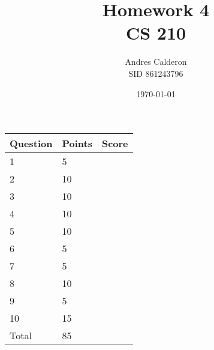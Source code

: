 \documentclass{article}
\title{Homework 4\\CS 210}
\author{Andres Calderon \\ SID 861243796}
\date{\today}
\begin{document}
\maketitle

\begin{center}
\begin{tabular}{|l|l|p{.4in}|}
\hline Question & Points & Score \\
\hline  1 & 5 & \\
\hline  2 & 10 & \\
\hline  3 & 10 & \\
\hline  4 & 10 & \\
\hline  5 & 10 & \\
\hline  6 &  5 & \\
\hline  7 &  5 & \\
\hline  8 &  10 & \\
\hline  9 &  5 & \\
\hline 10 & 15 & \\
\hline Total & 85 & \\
\hline 
\end{tabular}
\end{center}
\end{document}
